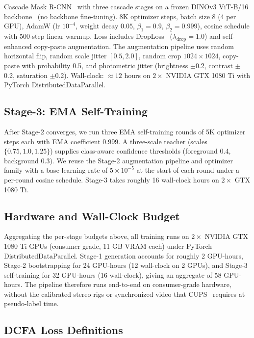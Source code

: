 \documentclass{article}
\begin{document}
Cascade Mask R-CNN~\cite{cai2018cascade} with three cascade stages on a frozen DINOv3 ViT-B/16 backbone~\cite{simeoni2025dinov3} (no backbone fine-tuning). 8K optimizer steps, batch size 8 (4 per GPU), AdamW (lr $10^{-4}$, weight decay $0.05$, $\beta_1{=}0.9$, $\beta_2{=}0.999$), cosine schedule with 500-step linear warmup. Loss includes DropLoss~\cite{wang2023cutler} ($\lambda_\text{drop}{=}1.0$) and self-enhanced copy-paste augmentation. The augmentation pipeline uses random horizontal flip, random scale jitter $[0.5, 2.0]$, random crop $1024\times1024$, copy-paste with probability 0.5, and photometric jitter (brightness $\pm$0.2, contrast $\pm$0.2, saturation $\pm$0.2). Wall-clock: $\approx 12$ hours on $2\times$ NVIDIA GTX 1080 Ti with PyTorch DistributedDataParallel.

\subsection{Stage-3: EMA Self-Training}
\label{sec:supp:impl:stage3}

After Stage-2 converges, we run three EMA self-training rounds of 5K optimizer steps each with EMA coefficient 0.999. A three-scale teacher (scales $\{0.75, 1.0, 1.25\}$) supplies class-aware confidence thresholds (foreground 0.4, background 0.3). We reuse the Stage-2 augmentation pipeline and optimizer family with a base learning rate of $5\times10^{-5}$ at the start of each round under a per-round cosine schedule. Stage-3 takes roughly 16 wall-clock hours on $2\times$ GTX 1080 Ti.

\subsection{Hardware and Wall-Clock Budget}
\label{sec:supp:impl:hardware}

Aggregating the per-stage budgets above, all training runs on $2\times$ NVIDIA GTX 1080 Ti GPUs (consumer-grade, 11 GB VRAM each) under PyTorch DistributedDataParallel. Stage-1 generation accounts for roughly 2 GPU-hours, Stage-2 bootstrapping for 24 GPU-hours (12 wall-clock on 2 GPUs), and Stage-3 self-training for 32 GPU-hours (16 wall-clock), giving an aggregate of 58 GPU-hours. The pipeline therefore runs end-to-end on consumer-grade hardware, without the calibrated stereo rigs or synchronized video that CUPS~\cite{hahn2025cups} requires at pseudo-label time.

\subsection{DCFA Loss Definitions}
\label{sec:supp:impl:dcfa_loss}
\end{document}
